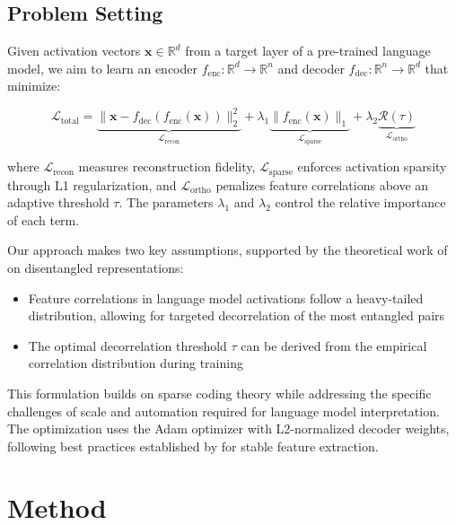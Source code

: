 \documentclass{article} %
\begin{document}
\subsection{Problem Setting}
Given activation vectors $\mathbf{x} \in \mathbb{R}^d$ from a target layer of a pre-trained language model, we aim to learn an encoder $f_{\text{enc}}: \mathbb{R}^d \rightarrow \mathbb{R}^n$ and decoder $f_{\text{dec}}: \mathbb{R}^n \rightarrow \mathbb{R}^d$ that minimize:

\begin{equation}
    \mathcal{L}_{\text{total}} = \underbrace{\|\mathbf{x} - f_{\text{dec}}(f_{\text{enc}}(\mathbf{x}))\|_2^2}_{\mathcal{L}_{\text{recon}}} + \lambda_1 \underbrace{\|f_{\text{enc}}(\mathbf{x})\|_1}_{\mathcal{L}_{\text{sparse}}} + \lambda_2 \underbrace{\mathcal{R}(\tau)}_{\mathcal{L}_{\text{ortho}}}
\end{equation}

where $\mathcal{L}_{\text{recon}}$ measures reconstruction fidelity, $\mathcal{L}_{\text{sparse}}$ enforces activation sparsity through L1 regularization, and $\mathcal{L}_{\text{ortho}}$ penalizes feature correlations above an adaptive threshold $\tau$. The parameters $\lambda_1$ and $\lambda_2$ control the relative importance of each term.

Our approach makes two key assumptions, supported by the theoretical work of \cite{Burgess2018UnderstandingDI} on disentangled representations:

\begin{itemize}
    \item Feature correlations in language model activations follow a heavy-tailed distribution, allowing for targeted decorrelation of the most entangled pairs
    \item The optimal decorrelation threshold $\tau$ can be derived from the empirical correlation distribution during training
\end{itemize}

This formulation builds on sparse coding theory while addressing the specific challenges of scale and automation required for language model interpretation. The optimization uses the Adam optimizer with L2-normalized decoder weights, following best practices established by \cite{Ngiam2011SparseF} for stable feature extraction.

\section{Method}
\label{sec:method}
\end{document}

